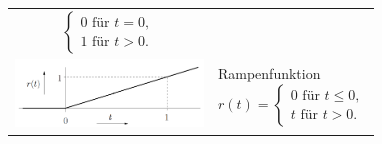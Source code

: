 \begin{tabular}{p{5cm} p{12.5cm}}
$$\begin{cases}
                 0 \textrm{ für }  t = 0, \\
                 1 \textrm{ für }  t >0.
               \end{cases}   $$                                                   \\
  \includegraphics[width=5cm, valign=t]{include/Wichtige Funktionen/img/Rampenfunktion.png}   &
  Rampenfunktion 
  $$r(t) = \begin{cases}
               0 \textrm{ für } t \leq 0, \\
               t \textrm{ für } t > 0.
             \end{cases}$$\\
\end{tabular}
